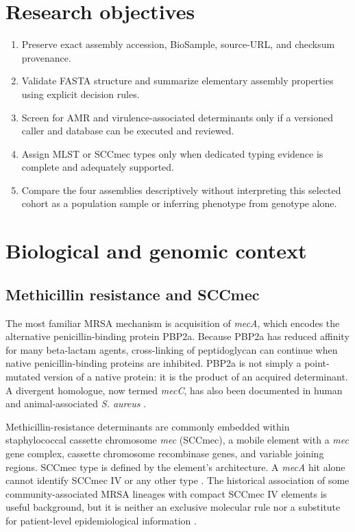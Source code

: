 \documentclass[11pt,a4paper]{article}
\begin{document}
\section{Research objectives}
\begin{enumerate}[leftmargin=1.6em,itemsep=0.15em,topsep=0.2em]
\item Preserve exact assembly accession, BioSample, source-URL, and checksum provenance.
\item Validate FASTA structure and summarize elementary assembly properties using explicit decision rules.
\item Screen for AMR and virulence-associated determinants only if a versioned caller and database can be executed and reviewed.
\item Assign MLST or SCCmec types only when dedicated typing evidence is complete and adequately supported.
\item Compare the four assemblies descriptively without interpreting this selected cohort as a population sample or inferring phenotype from genotype alone.
\end{enumerate}

\section{Biological and genomic context}
\subsection{Methicillin resistance and SCCmec}
The most familiar MRSA mechanism is acquisition of \textit{mecA}, which encodes the alternative penicillin-binding protein PBP2a. Because PBP2a has reduced affinity for many beta-lactam agents, cross-linking of peptidoglycan can continue when native penicillin-binding proteins are inhibited. PBP2a is not simply a point-mutated version of a native protein: it is the product of an acquired determinant. A divergent homologue, now termed \textit{mecC}, has also been documented in human and animal-associated \textit{S. aureus} \cite{Foster2004,GarciaAlvarez2011}.

Methicillin-resistance determinants are commonly embedded within staphylococcal cassette chromosome \textit{mec} (SCCmec), a mobile element with a \textit{mec} gene complex, cassette chromosome recombinase genes, and variable joining regions. SCCmec type is defined by the element's architecture. A \textit{mecA} hit alone cannot identify SCCmec IV or any other type \cite{IWGSCC2009}. The historical association of some community-associated MRSA lineages with compact SCCmec IV elements is useful background, but it is neither an exclusive molecular rule nor a substitute for patient-level epidemiological information \cite{Baba2002,Diep2006}.
\end{document}
